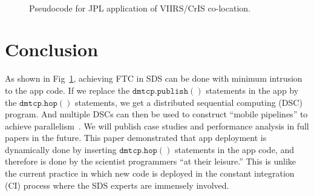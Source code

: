 \documentclass[conference]{IEEEtran}
\begin{document}
\begin{figure}[!ht]
\begin{center}
\begin{center}
\mbox{}\\[0.3em]
\end{center}
\hspace{\fill}%
\caption{Pseudocode for JPL application of VIIRS/CrIS co-location.}
\label{code:app}
\end{center}
\end{figure}


\section{Conclusion}
\label{sec:conclusion}

As shown in Fig~\ref{code:app}, achieving FTC in SDS can be done with minimum intrusion to the app code.
If we replace the $\mathtt{dmtcp.publish()}$ statements in the app by the $\mathtt{dmtcp.hop()}$ statements, we get a distributed sequential computing (DSC) program. And multiple DSCs can then be used to construct ``mobile pipelines'' to achieve parallelism~\cite{pan2004navp}. We will publish case studies and performance analysis in full papers in the future. This paper demonstrated that app deployment is dynamically done by inserting $\mathtt{dmtcp.hop()}$ statements in the app code, and therefore is done by the scientist programmers ``at their leisure.'' This is unlike the current practice in which new code is deployed in the constant integration (CI) process where the SDS experts are immensely involved.




\end{document}
